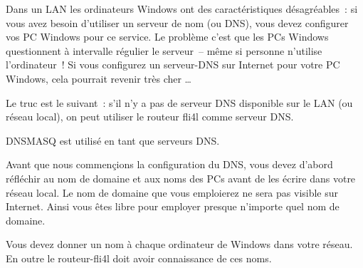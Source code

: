 

  Dans un LAN les ordinateurs Windows ont des caractéristiques désagréables~:
  si vous avez besoin d'utiliser un serveur de nom (ou DNS), vous devez
  configurer vos PC Windows pour ce service. Le problème c'est que les PCs
  Windows questionnent à intervalle régulier le serveur~-- même si personne
  n'utilise l'ordinateur~!
  Si vous configurez un serveur-DNS sur Internet pour votre PC Windows, cela
  pourrait revenir très cher \ldots

  Le truc est le suivant~: s'il n'y a pas de serveur DNS disponible sur
  le LAN (ou réseau local), on peut utiliser le routeur fli4l comme
  serveur DNS.

  DNSMASQ est utilisé en tant que serveurs DNS.

  Avant que nous commençions la configuration du DNS, vous devez d'abord
  réfléchir au nom de domaine et aux noms des PCs avant de les écrire dans
  votre réseau local. Le nom de domaine que vous emploierez ne sera pas
  visible sur Internet. Ainsi vous êtes libre pour employer presque
  n'importe quel nom de domaine.

  Vous devez donner un nom à chaque ordinateur de Windows dans votre réseau.
  En outre le routeur-fli4l doit avoir connaissance de ces noms.

